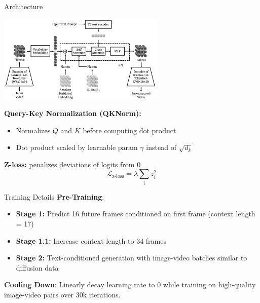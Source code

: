 \documentclass{beamer}
\begin{document}
\begin{frame}{Architecture}
	\begin{center}
            \includegraphics[width=0.6\textwidth]{./img/auto_arch.png}
	\end{center}
    \textbf{Query-Key Normalization (QKNorm):} 
    \begin{itemize}[label=-]
        \item Normalizes $Q$ and $K$ before computing dot product
        \item Dot product scaled by learnable param $\gamma$ instead of $\sqrt{d_k}$\newline
    \end{itemize}
    \textbf{Z-loss:} penalizes deviations of logits from 0
    \[\mathcal{L}_{\text{z-loss}} = \lambda \sum_i z_i^2\]


\end{frame}

\begin{frame}{Training Details}
    \textbf{Pre-Training}:
    \begin{itemize}[label=-]
        \item \textbf{Stage 1:} Predict 16 future frames conditioned on first frame (context length = 17)
        \item \textbf{Stage 1.1:} Increase context length to 34 frames
        \item \textbf{Stage 2:} Text-conditioned generation with image-video batches similar to diffusion data 
    \end{itemize}
    \textbf{Cooling Down}: Linearly decay learning rate to 0 while training on high-quality image-video pairs over 30k iterations.

\end{frame}
\end{document}
